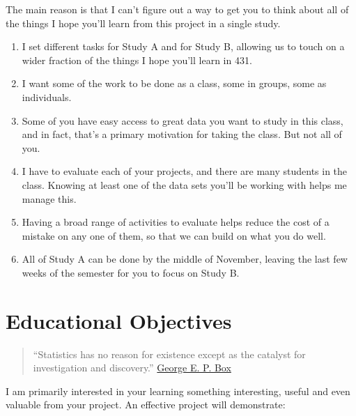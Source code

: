 \documentclass[]{book}
\providecommand{\tightlist}{%
  \setlength{\itemsep}{0pt}\setlength{\parskip}{0pt}}
\begin{document}
The main reason is that I can't figure out a way to get you to think about all of the things I hope you'll learn from this project in a single study.

\begin{enumerate}
\def\labelenumi{\arabic{enumi}.}
\tightlist
\item
  I set different tasks for Study A and for Study B, allowing us to touch on a wider fraction of the things I hope you'll learn in 431.
\item
  I want some of the work to be done as a class, some in groups, some as individuals.
\item
  Some of you have easy access to great data you want to study in this class, and in fact, that's a primary motivation for taking the class. But not all of you.
\item
  I have to evaluate each of your projects, and there are many students in the class. Knowing at least one of the data sets you'll be working with helps me manage this.
\item
  Having a broad range of activities to evaluate helps reduce the cost of a mistake on any one of them, so that we can build on what you do well.
\item
  All of Study A can be done by the middle of November, leaving the last few weeks of the semester for you to focus on Study B.
\end{enumerate}

\hypertarget{educational-objectives}{%
\section{Educational Objectives}\label{educational-objectives}}

\begin{quote}
``Statistics has no reason for existence except as the catalyst for investigation and discovery.'' \href{https://en.wikipedia.org/wiki/George_E._P._Box}{George E. P. Box}
\end{quote}

I am primarily interested in your learning something interesting, useful and even valuable from your project. An effective project will demonstrate:
\end{document}
